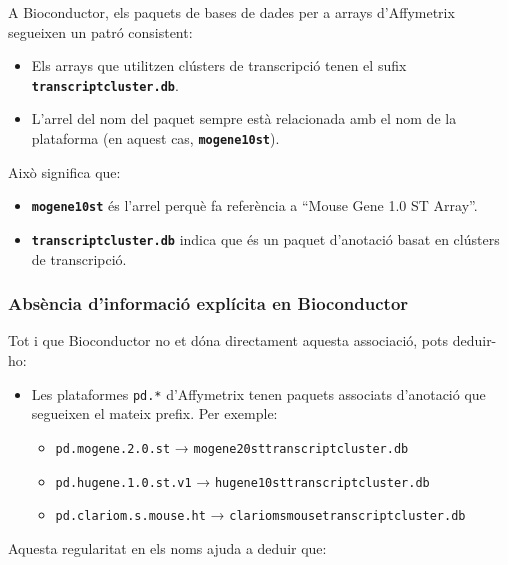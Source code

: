 \documentclass[
]{article}
\begin{document}
A Bioconductor, els paquets de bases de dades per a arrays d'Affymetrix
segueixen un patró consistent:

\begin{itemize}
\item
  Els arrays que utilitzen clústers de transcripció tenen el sufix
  \textbf{\texttt{transcriptcluster.db}}.
\item
  L'arrel del nom del paquet sempre està relacionada amb el nom de la
  plataforma (en aquest cas, \textbf{\texttt{mogene10st}}).
\end{itemize}

Això significa que:

\begin{itemize}
\item
  \textbf{\texttt{mogene10st}} és l'arrel perquè fa referència a ``Mouse
  Gene 1.0 ST Array''.
\item
  \textbf{\texttt{transcriptcluster.db}} indica que és un paquet
  d'anotació basat en clústers de transcripció.
\end{itemize}

\subsubsection{\texorpdfstring{\textbf{Absència d'informació explícita
en
Bioconductor}}{Absència d'informació explícita en Bioconductor}}\label{absuxe8ncia-dinformaciuxf3-expluxedcita-en-bioconductor}

Tot i que Bioconductor no et dóna directament aquesta associació, pots
deduir-ho:

\begin{itemize}
\item
  Les plataformes \texttt{pd.*} d'Affymetrix tenen paquets associats
  d'anotació que segueixen el mateix prefix. Per exemple:

  \begin{itemize}
  \item
    \texttt{pd.mogene.2.0.st} → \texttt{mogene20sttranscriptcluster.db}
  \item
    \texttt{pd.hugene.1.0.st.v1} →
    \texttt{hugene10sttranscriptcluster.db}
  \item
    \texttt{pd.clariom.s.mouse.ht} →
    \texttt{clariomsmousetranscriptcluster.db}
  \end{itemize}
\end{itemize}

Aquesta regularitat en els noms ajuda a deduir que:
\end{document}
